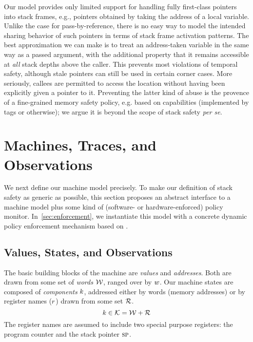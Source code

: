 \documentclass[acmsmall,review,anonymous]{acmart}\settopmatter{printfolios=true,printccs=false,printacmref=false}
\begin{document}
Our model provides only limited support for handling fully first-class pointers into
stack frames, e.g., pointers obtained by taking the address of a local variable.
Unlike the case for pass-by-reference, there is no easy way to model the intended sharing behavior
of such pointers in terms of stack frame activation patterns.  The best approximation we can make is to
treat an address-taken variable in the same way as a passed argument, with the additional property
that it remains accessible at \emph{all} stack depths above the caller.
This prevents most violations of temporal safety, although stale pointers can still be
used in certain corner cases. 
More seriously, callees are permitted to access the location without having
been explicitly given a pointer to it.  Preventing the latter kind of abuse
is the provence of a fine-grained memory safety policy, e.g. based on capabilities
(implemented by tags or otherwise); we argue it is beyond the scope of stack safety
\emph{per se}.

\section{Machines, Traces, and Observations}
\label{sec:prelim}

We next define our machine model precisely. To make our definition of stack safety
as generic as possible, this section proposes an abstract interface to a
machine model plus some kind of (software- or hardware-enforced) policy monitor.
In~\cref{sec:enforcement}, we instantiate this model with a concrete dynamic
policy enforcement mechanism based on \citet{DBLP:conf/sp/RoesslerD18}.

\subsection{Values, States, and Observations}

The basic building blocks of the machine are {\em values} and {\em addresses}.
Both are drawn from some set of {\em words} \({\mathcal W}\), ranged over by \(w\).
%
Our machine states are composed of {\em components} \(k\),
addressed either by
words (memory addresses) or by register names (\(r\)) drawn from some set
\({\mathcal R}\).
%
    \[k \in {\mathcal K} = {\mathcal W} + {\mathcal R} \]
%
The register names are assumed to include two special purpose registers: the
program counter {\PCname} and the stack pointer \(\textsc{sp}\).
\end{document}

